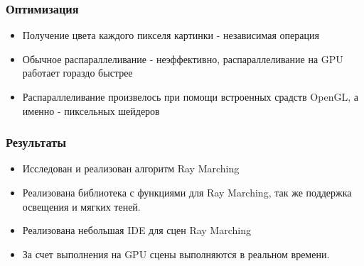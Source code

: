 \documentclass{beamer}
\begin{document}
\begin{frame}\frametitle{Оптимизация}
\begin{itemize}
    \item Получение цвета каждого пикселя картинки - независимая операция
    \item Обычное распараллеливание - неэффективно, распараллеливание на GPU работает гораздо быстрее
    \item Распараллеливание произвелось при помощи встроенных срадств OpenGL, а именно - пиксельных шейдеров
\end{itemize}
\end{frame}

\begin{frame}\frametitle{Результаты}
\begin{itemize}
    \item Исследован и реализован алгоритм Ray Marching
    \item Реализована библиотека с функциями для Ray Marching, так же поддержка освещения и мягких теней.
    \item Реализована небольшая IDE для сцен Ray Marching
    \item За счет выполнения на GPU сцены выполняются в реальном времени.
\end{itemize}
\end{frame}
\end{document}
